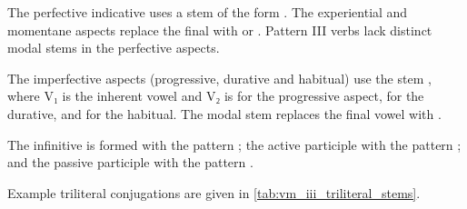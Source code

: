 \documentclass[grammar]{subfiles}
\begin{document}
The perfective indicative uses a stem of the form . The
experiential and momentane aspects replace the final  with  or
.  Pattern III verbs lack distinct modal stems in the perfective aspects.  

The imperfective aspects (progressive, durative and  habitual) use the stem
, where V₁ is the inherent vowel and V₂ is  for the
progressive aspect,  for the durative, and  for the habitual.
The modal stem replaces the final vowel with . 

The infinitive is formed with the pattern ; the active participle
with the pattern ; and the passive participle with the pattern
.

Example triliteral conjugations are given in \cref{tab:vm_iii_triliteral_stems}. 

\begin{table}[h!]\small\capstart
  \centering
  \\
  \caption{Pattern III triliteral stems \label{tab:vm_iii_triliteral_stems}}
\end{table}
\end{document}
